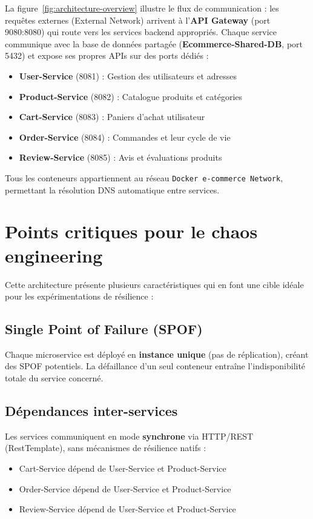 La figure~\ref{fig:architecture-overview} illustre le flux de communication : les requêtes externes (External Network) arrivent à l'\textbf{API Gateway} (port 9080:8080) qui route vers les services backend appropriés. Chaque service communique avec la base de données partagée (\textbf{Ecommerce-Shared-DB}, port 5432) et expose ses propres APIs sur des ports dédiés :

\begin{itemize}
    \item \textbf{User-Service} (8081) : Gestion des utilisateurs et adresses
    \item \textbf{Product-Service} (8082) : Catalogue produits et catégories
    \item \textbf{Cart-Service} (8083) : Paniers d'achat utilisateur
    \item \textbf{Order-Service} (8084) : Commandes et leur cycle de vie
    \item \textbf{Review-Service} (8085) : Avis et évaluations produits
\end{itemize}

Tous les conteneurs appartiennent au réseau \texttt{Docker e-commerce Network}, permettant la résolution DNS automatique entre services.

\section{Points critiques pour le chaos engineering}

Cette architecture présente plusieurs caractéristiques qui en font une cible idéale pour les expérimentations de résilience :

\subsection{Single Point of Failure (SPOF)}

Chaque microservice est déployé en \textbf{instance unique} (pas de réplication), créant des SPOF potentiels. La défaillance d'un seul conteneur entraîne l'indisponibilité totale du service concerné.

\subsection{Dépendances inter-services}

Les services communiquent en mode \textbf{synchrone} via HTTP/REST (RestTemplate), sans mécanismes de résilience natifs :
\begin{itemize}
    \item Cart-Service dépend de User-Service et Product-Service
    \item Order-Service dépend de User-Service et Product-Service
    \item Review-Service dépend de User-Service et Product-Service
\end{itemize}

